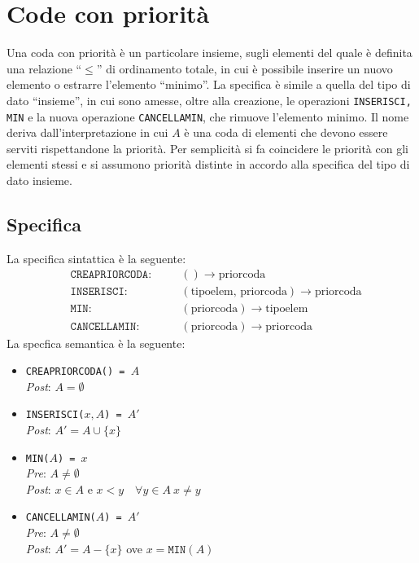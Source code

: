 \documentclass[12pt]{report}
\begin{document}
  	\chapter{Code con priorità}
  	Una coda con priorità è un particolare insieme, sugli elementi del quale è definita una relazione ``$\leq$'' di ordinamento totale, in cui è possibile inserire un nuovo elemento o estrarre l'elemento ``minimo''. La specifica è simile a quella del tipo di dato ``insieme'', in cui sono amesse, oltre alla creazione, le operazioni \texttt{INSERISCI, MIN} e la nuova operazione \texttt{CANCELLAMIN}, che rimuove l'elemento minimo.
  	Il nome deriva dall'interpretazione in cui $A$ è una coda di elementi che devono essere serviti rispettandone la priorità. Per semplicità si fa coincidere le priorità con gli elementi stessi e si assumono priorità distinte in accordo alla specifica del tipo di dato insieme. \\
  	\section{Specifica}
  	La specifica sintattica è la seguente:
  	\begin{align*}
  		&\texttt{CREAPRIORCODA:} &\quad &() \to \text{priorcoda} \\
  		&\texttt{INSERISCI:} &\quad &(\text{tipoelem, priorcoda}) \to \text{priorcoda} \\
  		&\texttt{MIN:} &\quad &(\text{priorcoda}) \to \text{tipoelem} \\
  		&\texttt{CANCELLAMIN:} &\quad &(\text{priorcoda}) \to \text{priorcoda}
  	\end{align*}
  	La specfica semantica è la seguente:
  	  	\begin{itemize}
		\item \texttt{CREAPRIORCODA() = $A$} \\
		\quad \textit{Post}: $A = \emptyset$

		\item \texttt{INSERISCI($x, A$) = $A'$} \\
		\quad \textit{Post}: $A' = A \cup \{x\}$

		\item \texttt{MIN($A$) = $x$} \\
		\quad \textit{Pre}: $A \neq \emptyset$ \\
		\quad \textit{Post}: $x \in A$ e $x < y \quad \forall y \in A\ x \neq y$

  		\item \texttt{CANCELLAMIN($A$) = $A'$} \\
  		\quad \textit{Pre}: $A \neq \emptyset$ \\
  		\quad \textit{Post}: $A' = A - \{x\}$ ove $x = \texttt{MIN}(A)$
  	\end{itemize}
\end{document}
